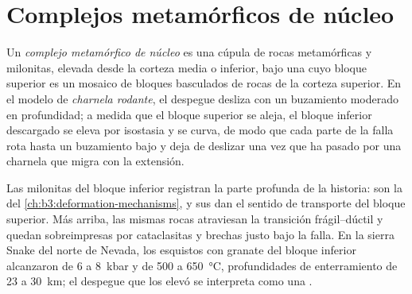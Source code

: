 \section{Complejos metamórficos de núcleo}\label{sec:b3:extension-strike-slip:core}

\begin{definition}\label{def:b3:extension-strike-slip:core-complex}
Un \emph{complejo metamórfico de núcleo} es una cúpula de
rocas metamórficas y milonitas, elevada desde la corteza media o inferior,
bajo una  cuyo bloque superior es un mosaico de bloques basculados de
rocas de la corteza superior. En el modelo de \emph{charnela rodante},
el despegue desliza con un buzamiento moderado en profundidad; a medida que el bloque superior
se aleja, el bloque inferior descargado se eleva por isostasia y se curva, de modo que cada parte
de la falla rota hasta un buzamiento bajo y deja de deslizar una vez que ha pasado
por una charnela que migra con la extensión.
\end{definition}

Las milonitas del bloque inferior registran la parte profunda de la historia: son la
 del \cref{ch:b3:deformation-mechanisms}, y sus  dan el sentido de transporte del bloque superior. Más arriba, las
mismas rocas atraviesan la transición frágil--dúctil y quedan sobreimpresas por
cataclasitas y brechas justo bajo la falla. En la sierra Snake del norte de Nevada, los
esquistos con granate del bloque inferior alcanzaron de 6 a \qty{8}{kbar} y
de 500 a \qty{650}{\celsius}, profundidades de enterramiento de 23 a \qty{30}{km}; el
despegue que los elevó se interpreta como una .

